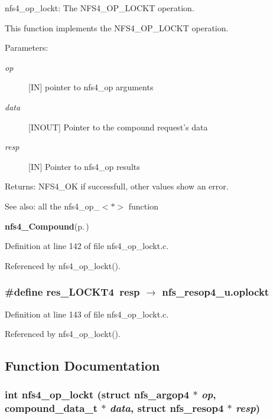 nfs4\_\-op\_\-lockt: The NFS4\_\-OP\_\-LOCKT operation.

This function implements the NFS4\_\-OP\_\-LOCKT operation.

\begin{Desc}
\item[Parameters:]
\begin{description}
\item[{\em op}][IN] pointer to nfs4\_\-op arguments \item[{\em data}][INOUT] Pointer to the compound request's data \item[{\em resp}][IN] Pointer to nfs4\_\-op results\end{description}
\end{Desc}
\begin{Desc}
\item[Returns:]NFS4\_\-OK if successfull, other values show an error.\end{Desc}
\begin{Desc}
\item[See also:]all the nfs4\_\-op\_\-$<$$\ast$$>$ function 

{\bf nfs4\_\-Compound}{\rm (p.\,\pageref{nfs4__Compound_8c_a4})} \end{Desc}


Definition at line 142 of file nfs4\_\-op\_\-lockt.c.

Referenced by nfs4\_\-op\_\-lockt().
\subsubsection{\setlength{\rightskip}{0pt plus 5cm}\#define res\_\-LOCKT4\ resp $\rightarrow$ nfs\_\-resop4\_\-u.oplockt}\label{nfs4__op__lockt_8c_a1}




Definition at line 143 of file nfs4\_\-op\_\-lockt.c.

Referenced by nfs4\_\-op\_\-lockt().

\subsection{Function Documentation}
\subsubsection{\setlength{\rightskip}{0pt plus 5cm}int nfs4\_\-op\_\-lockt (struct nfs\_\-argop4 $\ast$ {\em op}, compound\_\-data\_\-t $\ast$ {\em data}, struct nfs\_\-resop4 $\ast$ {\em resp})}\label{nfs4__op__lockt_8c_a2}




